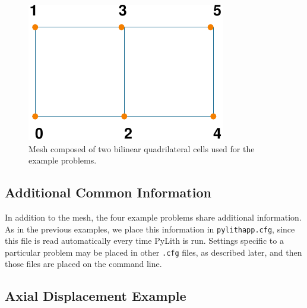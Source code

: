 \noindent \begin{center}
\begin{figure}
\begin{centering}
\includegraphics{tutorials/twocells/figs/twoquad4-mesh}
\par\end{centering}

\caption{Mesh composed of two bilinear quadrilateral cells used for the example
problems.\label{fig:twoquad4-mesh}}
\end{figure}

\par\end{center}


\subsection{Additional Common Information}

In addition to the mesh, the four example problems share additional
information. As in the previous examples, we place this information
in \texttt{pylithapp.cfg}, since this file is read automatically every
time PyLith is run. Settings specific to a particular problem may
be placed in other \texttt{.cfg} files, as described later, and then
those files are placed on the command line.


\subsection{Axial Displacement Example}

